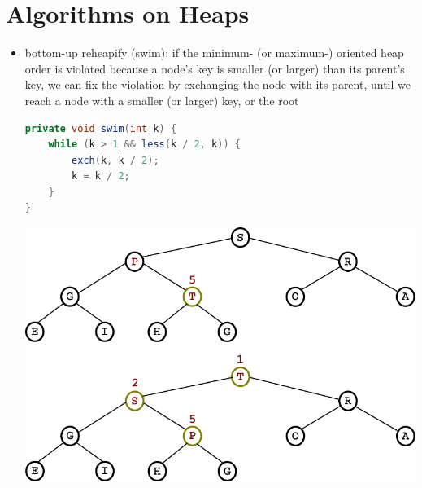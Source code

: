 \documentclass[8pt,a4paper,compress]{beamer}
\begin{document}
\section{Algorithms on Heaps}
\begin{frame}[fragile]
\begin{itemize}
\item bottom-up reheapify (swim): if the minimum- (or maximum-) oriented heap order is violated because a node's key is smaller (or larger) than its parent's key, we can fix the violation by exchanging the node with its parent, until we reach a node with a smaller (or larger) key, or the root

\bigskip

\begin{minipage}{150pt}
\begin{lstlisting}[language=Java]
private void swim(int k) {
    while (k > 1 && less(k / 2, k)) { 
        exch(k, k / 2); 
        k = k / 2; 
    }
}
\end{lstlisting}
\end{minipage}%
\begin{minipage}{130pt}
\hfill \includegraphics[scale=0.35]{./figures/heapify_swim.pdf}
\end{minipage}
\end{itemize}
\end{frame}
\end{document}
